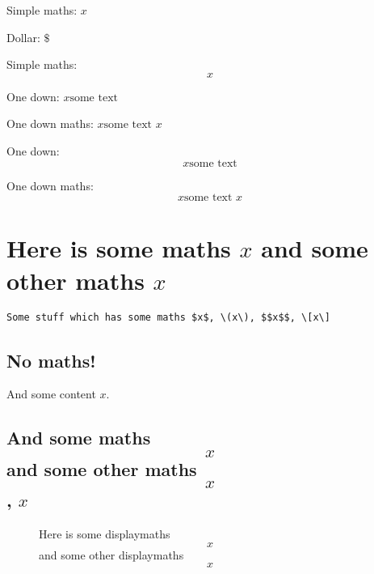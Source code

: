 \documentclass{article}
\begin{document}
Simple maths: $x$

Dollar: $\$$

Simple maths: $$x$$

One down: $x \text{some text}$

One down maths: $x \text{some text $x$}$

One down: $$x \text{some text}$$

One down maths: $$x \text{some text $x$}$$

\section{Here is some maths $x$ and some other maths \(x\)}

\begin{verbatim}
Some stuff which has some maths $x$, \(x\), $$x$$, \[x\]
\end{verbatim}

\subsection[Maths! $x$ and \(x\)]{No maths!}

\begin{theorem}
  And some content \(x\).
\end{theorem}

\subsection[Maths! $x$ and \(x\)]{And some maths $$x$$ and some other maths \[x\], \(x\)}

\begin{figure}
\caption{Here is some displaymaths $$x$$ and some other displaymaths \[x\]}
\end{figure}
\end{document}
